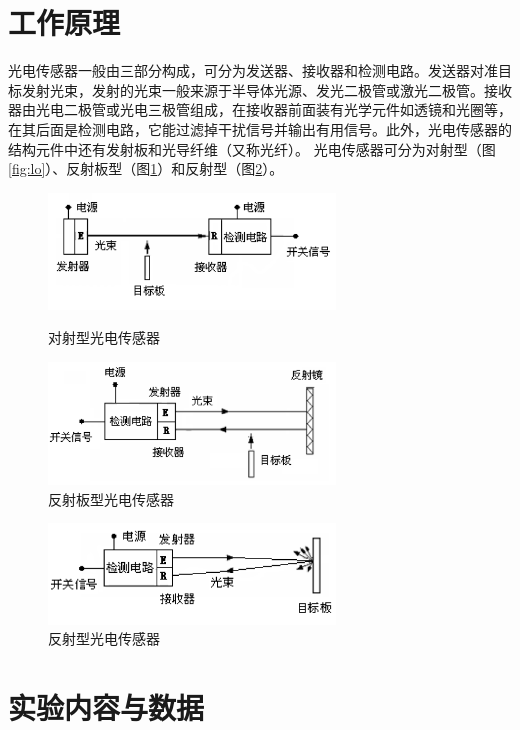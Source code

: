 	\section{工作原理}
	光电传感器一般由三部分构成，可分为发送器、接收器和检测电路。发送器对准目标发射光束，发射的光束一般来源于半导体光源、发光二极管或激光二极管。接收器由光电二极管或光电三极管组成，在接收器前面装有光学元件如透镜和光圈等，在其后面是检测电路，它能过滤掉干扰信号并输出有用信号。此外，光电传感器的结构元件中还有发射板和光导纤维（又称光纤）。
	光电传感器可分为对射型（图\ref{fig:lo}）、反射板型（图\ref{fig:lr}）和反射型（图\ref{fig:lb}）。
	\begin{figure}[htbp]
	\begin{minipage}[t]{0.5\linewidth}
	\centering
	\includegraphics[width=3in]{resource/lo.png}
	\caption{对射型光电传感器}
	\label{fig:lo}
	\end{minipage}
	\begin{minipage}[t]{0.5\linewidth}
	\centering
	\includegraphics[width=3in]{resource/lr.png}
	\caption{反射板型光电传感器}
	\label{fig:lr}
	\end{minipage}
	\end{figure}
	\begin{figure}[htbp]
	\centering
	\includegraphics[width=3in]{resource/lb.png}
	\caption{反射型光电传感器}
	\label{fig:lb}
	\end{figure}

	\section{实验内容与数据}
